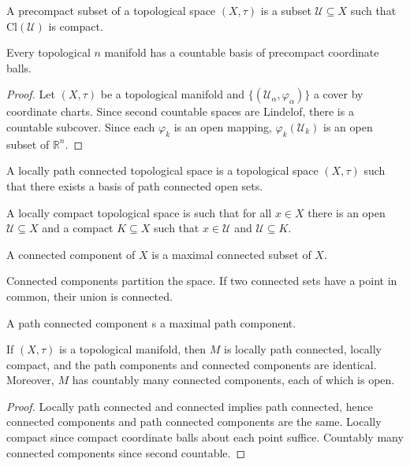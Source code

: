     \begin{definition}
        A precompact subset of a topological space $(X,\tau)$ is a subset
        $\mathcal{U}\subseteq{X}$ such that $\textrm{Cl}(\mathcal{U})$
        is compact.
    \end{definition}
    \begin{theorem}
        Every topological $n$ manifold has a countable basis of precompact
        coordinate balls.
    \end{theorem}
    \begin{proof}
        Let $(X,\tau)$ be a topological manifold and
        $\{(\mathcal{U}_{\alpha},\varphi_{\alpha})\}$ a cover by coordinate
        charts. Since second countable spaces are Lindelof, there is a
        countable subcover. Since each $\varphi_{k}$ is an open mapping,
        $\varphi_{k}(\mathcal{U}_{k})$ is an open subset of
        $\mathbb{R}^{n}$.
    \end{proof}
    \begin{definition}
        A locally path connected topological space is a topological space
        $(X,\tau)$ such that there exists a basis of path connected open
        sets.
    \end{definition}
    \begin{definition}
        A locally compact topological space is such that for all $x\in{X}$
        there is an open $\mathcal{U}\subseteq{X}$ and a compact
        $K\subseteq{X}$ such that $x\in\mathcal{U}$ and
        $\mathcal{U}\subseteq{K}$.
    \end{definition}
    \begin{definition}
        A connected component of $X$ is a maximal connected subset of $X$.
    \end{definition}
    Connected components partition the space. If two connected sets have
    a point in common, their union is connected.
    \begin{definition}
        A path connected component s a maximal path component.
    \end{definition}
    \begin{theorem}
        If $(X,\tau)$ is a topological manifold, then $M$ is locally path
        connected, locally compact, and the path components and connected
        components are identical. Moreover, $M$ has countably many connected
        components, each of which is open.
    \end{theorem}
    \begin{proof}
        Locally path connected and connected implies path connected, hence
        connected components and path connected components are the same.
        Locally compact since compact coordinate balls about each point
        suffice. Countably many connected components since second countable.
    \end{proof}
